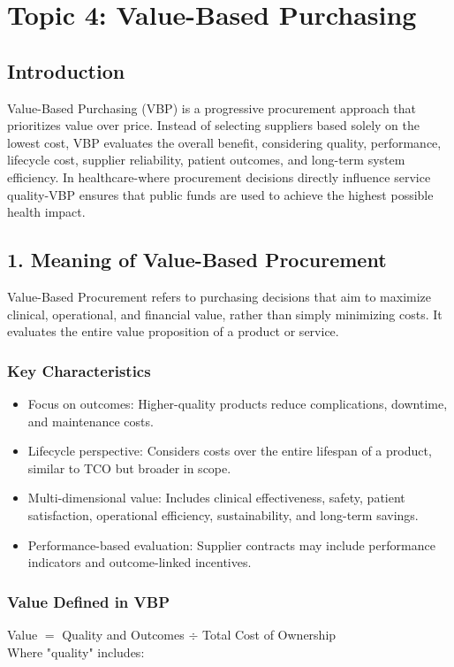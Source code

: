 \documentclass[10pt]{article}
\begin{document}
\section*{Topic 4: Value-Based Purchasing}
\subsection*{Introduction}
Value-Based Purchasing (VBP) is a progressive procurement approach that prioritizes value over price. Instead of selecting suppliers based solely on the lowest cost, VBP evaluates the overall benefit, considering quality, performance, lifecycle cost, supplier reliability, patient outcomes, and long-term system efficiency. In healthcare-where procurement decisions directly influence service quality-VBP ensures that public funds are used to achieve the highest possible health impact.

\subsection*{1. Meaning of Value-Based Procurement}
Value-Based Procurement refers to purchasing decisions that aim to maximize clinical, operational, and financial value, rather than simply minimizing costs. It evaluates the entire value proposition of a product or service.

\subsubsection*{Key Characteristics}
\begin{itemize}
  \item Focus on outcomes: Higher-quality products reduce complications, downtime, and maintenance costs.
  \item Lifecycle perspective: Considers costs over the entire lifespan of a product, similar to TCO but broader in scope.
  \item Multi-dimensional value: Includes clinical effectiveness, safety, patient satisfaction, operational efficiency, sustainability, and long-term savings.
  \item Performance-based evaluation: Supplier contracts may include performance indicators and outcome-linked incentives.
\end{itemize}

\subsubsection*{Value Defined in VBP}
Value $=$ Quality and Outcomes $\div$ Total Cost of Ownership\\
Where "quality" includes:
\end{document}

